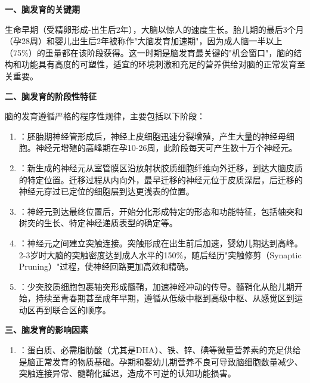 \begin{keybox}
\textbf{}

\textbf{一、脑发育的关键期}

生命早期（受精卵形成-出生后2年），大脑以惊人的速度生长。胎儿期的最后3个月（孕28周）和婴儿出生后2年被称作"大脑发育加速期"，因为成人脑一半以上（75\%）的重量都在该阶段获得。这一时期是脑发育最关键的"机会窗口"，脑的结构和功能具有高度的可塑性，适宜的环境刺激和充足的营养供给对脑的正常发育至关重要。

\textbf{二、脑发育的阶段性特征}

脑的发育遵循严格的程序性规律，主要包括以下阶段：

\begin{enumerate}[leftmargin=*]
    \item {}：胚胎期神经管形成后，神经上皮细胞迅速分裂增殖，产生大量的神经母细胞。神经元增殖的高峰期在孕10-26周，此阶段每天可产生数十万个神经元。

    \item {}：新生成的神经元从室管膜区沿放射状胶质细胞纤维向外迁移，到达大脑皮质的特定位置。迁移过程从内向外，最早迁移的神经元位于皮质深层，后迁移的神经元穿过已定位的细胞层到达更浅表的位置。

    \item {}：神经元到达最终位置后，开始分化形成特定的形态和功能特征，包括轴突和树突的生长、特定神经递质表型的确定等。

    \item {}：神经元之间建立突触连接。突触形成在出生前后加速，婴幼儿期达到高峰。2-3岁时大脑的突触密度达到成人水平的150\%，随后经历"突触修剪（Synaptic Pruning）"过程，使神经回路更加高效和精确。

    \item {}：少突胶质细胞包裹轴突形成髓鞘，加速神经冲动的传导。髓鞘化从胎儿期开始，持续至青春期甚至成年早期，遵循从低级中枢到高级中枢、从感觉区到运动区再到联合区的顺序。
\end{enumerate}

\textbf{三、脑发育的影响因素}

\begin{enumerate}[leftmargin=*]
    \item {}：蛋白质、必需脂肪酸（尤其是DHA）、铁、锌、碘等微量营养素的充足供给是脑正常发育的物质基础。孕期和婴幼儿期营养不良可导致脑细胞数量减少、突触连接异常、髓鞘化延迟，造成不可逆的认知功能损害。


\end{enumerate}
\end{keybox}
